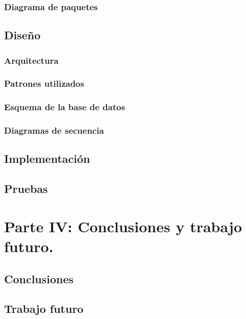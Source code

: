 \documentclass[twoside]{report}
\begin{document}
\subsection{Diagrama de paquetes}
\section{Diseño}
\subsection{Arquitectura}
\subsection{Patrones utilizados}
\subsection{Esquema de la base de datos}
\subsection{Diagramas de secuencia}
\section{Implementación}
\section{Pruebas}

\chapter{Parte IV: Conclusiones y trabajo futuro.}
\section{Conclusiones}
\section{Trabajo futuro}
\end{document}
